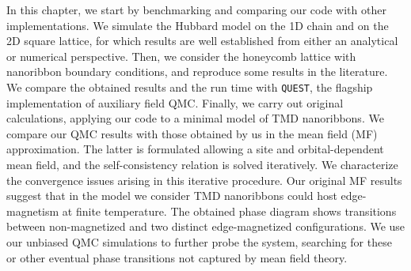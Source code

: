 
\label{cap:applications}

\slshape

In this chapter, we start by benchmarking and comparing our code with other implementations.
We simulate the Hubbard model on the \acs{1D} chain and on the \acs{2D} square lattice, for which results are well established from either an analytical or numerical perspective.
Then, we consider the honeycomb lattice with  nanoribbon boundary conditions, and reproduce some results in the literature.
We compare the obtained results and the run time with \texttt{QUEST}, the flagship implementation of auxiliary field \acs{QMC}.
Finally, we carry out original calculations, applying our code to a minimal model of \acs{TMD} nanoribbons.
We compare our \acs{QMC} results with those obtained by us in the mean field (MF)  approximation.
The latter is formulated allowing a site and orbital-dependent mean field, and the self-consistency relation is solved iteratively.
We characterize the convergence issues arising in this iterative procedure.
Our original MF results suggest that in the model we consider \acs{TMD} nanoribbons could host edge-magnetism at finite temperature.
The obtained phase diagram shows transitions between non-magnetized and two distinct edge-magnetized configurations.
We use our unbiased \acs{QMC} simulations to further probe the system, searching for these or other eventual phase transitions not captured by mean field theory.

\normalfont




